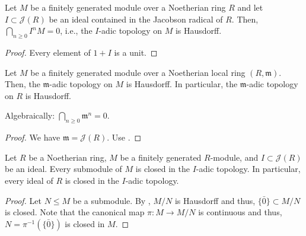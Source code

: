 \begin{cor} \label{cor:ideal-in-jacobson-hausdorff}
	Let $M$ be a finitely generated module over a Noetherian ring $R$ and let $I \subset \mathcal{J}(R)$ be an ideal contained in the Jacobson radical of $R$. Then, $\bigcap_{n \ge 0} I^{n} M = 0$, i.e., the $I$-adic topology on $M$ is Hausdorff.
\end{cor}
\begin{proof} 
	Every element of $1 + I$ is a unit.
\end{proof}

\begin{cor} \label{cor:noetherian-local-m-adic-hausdorff}
	Let $M$ be a finitely generated module over a Noetherian local ring $(R, \mathfrak{m})$. Then, the $\mathfrak{m}$-adic topology on $M$ is Hausdorff. In particular, the $\mathfrak{m}$-adic topology on $R$ is Hausdorff.

	Algebraically: $\bigcap_{n \ge 0} \mathfrak{m}^{n} = 0$.
\end{cor}
\begin{proof} 
	We have $\mathfrak{m} = \mathcal{J}(R)$. Use .
\end{proof}

\begin{cor} \label{cor:jacobson-ideals-are-closed}
	Let $R$ be a Noetherian ring, $M$ be a finitely generated $R$-module, and $I \subset \mathcal{J}(R)$ be an ideal. Every submodule of $M$ is closed in the $I$-adic topology. In particular, every ideal of $R$ is closed in the $I$-adic topology.
\end{cor}
\begin{proof} 
	Let $N \le M$ be a submodule. By , $M/N$ is Hausdorff and thus, $\{\bar{0}\} \subset M/N$ is closed. Note that the canonical map $\pi : M \to M/N$ is continuous and thus, $N = \pi^{-1}(\{\bar{0}\})$ is closed in $M$.
\end{proof}

